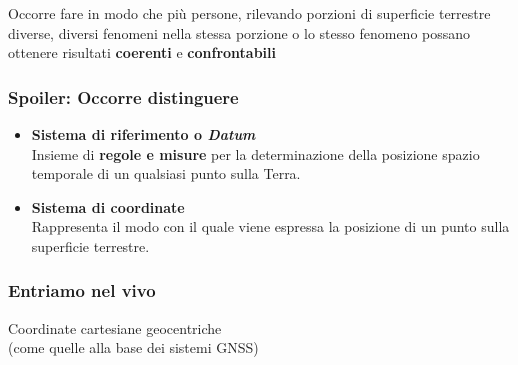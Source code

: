 \documentclass{beamer}
\begin{document}
{\begin{frame}
   {\small Occorre fare in modo che più persone, rilevando porzioni di superficie terrestre
   diverse, diversi fenomeni nella stessa porzione o lo stesso fenomeno possano
   ottenere risultati \textbf{coerenti} e \textbf{confrontabili}}

\end{frame}

\begin{frame}
   \frametitle{Spoiler: Occorre distinguere}

    \begin{itemize}
         \item \textbf{Sistema di riferimento o \textit{Datum}}\\
            Insieme di \textbf{regole e misure} per la determinazione della posizione
            spazio temporale di un qualsiasi punto sulla Terra.\\
         
         
         \item \textbf{Sistema di coordinate}\\
            Rappresenta il modo con il quale viene espressa la posizione di un
            punto sulla superficie terrestre.
         
    \end{itemize}

\end{frame}

\begin{frame}
   \frametitle{Entriamo nel vivo}

   Coordinate cartesiane geocentriche\\
   (come quelle alla base dei sistemi GNSS)


\end{frame}}
\end{document}
